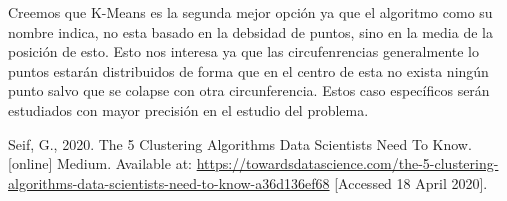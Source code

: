 \documentclass[conference,a4paper]{IEEEtran}
\begin{document}
Creemos que K-Means es la segunda mejor opción ya que el algoritmo como su nombre indica, no esta basado en la debsidad de puntos, sino en la media de la posición de esto. Esto nos interesa ya que las circufenrencias generalmente lo puntos estarán distribuidos de forma que en el centro de esta no exista ningún punto salvo que se colapse con otra circunferencia. Estos caso específicos serán estudiados con mayor precisión en el estudio del problema.\\



\clearpage
\begin{thebibliography}{9}
	
	\label{bib:georgeSeif}
	Seif, G., 2020. The 5 Clustering Algorithms Data Scientists Need To Know. [online] Medium. 
	Available at: \href{https://towardsdatascience.com/the-5-clustering-algorithms-data-scientists-need-to-know-a36d136ef68}{https://towardsdatascience.com/the-5-clustering-algorithms-data-scientists-need-to-know-a36d136ef68}
	[Accessed 18 April 2020].

\end{thebibliography}
\end{document}
